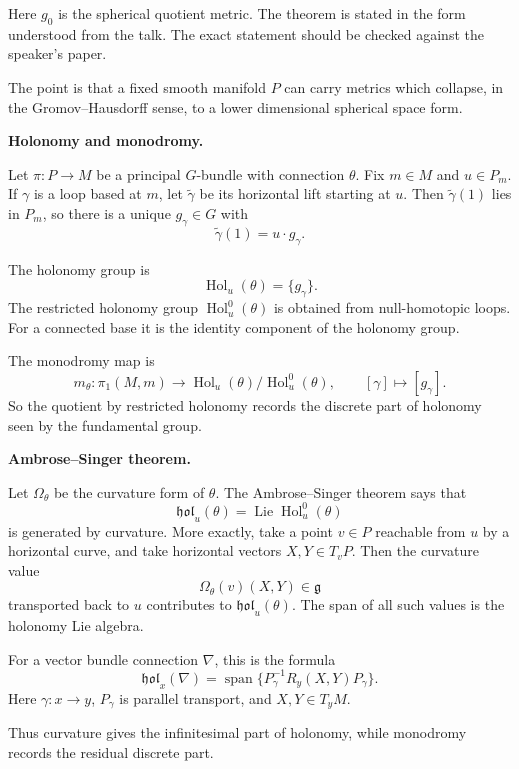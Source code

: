 Here $g_0$ is the spherical quotient
metric.
The theorem is stated in the form
understood from the talk.
The exact statement should be checked
against the speaker's paper.

The point is that a fixed smooth
manifold $P$ can carry metrics which
collapse, in the Gromov--Hausdorff
sense, to a lower dimensional spherical
space form.

\medskip\noindent
{\bf Holonomy and monodromy.}

Let $\pi:P\to M$ be a principal
$G$-bundle with connection $\theta$.
Fix $m\in M$ and $u\in P_m$.
If $\gamma$ is a loop based at $m$,
let $\widetilde\gamma$ be its
horizontal lift starting at $u$.
Then $\widetilde\gamma(1)$ lies in
$P_m$, so there is a unique
$g_\gamma\in G$ with
$$
        \widetilde\gamma(1)
        =
        u\cdot g_\gamma .
$$

The holonomy group is
$$
        \operatorname{Hol}_u(\theta)
        =
        \{g_\gamma\}.
$$
The restricted holonomy group
$\operatorname{Hol}_u^0(\theta)$ is
obtained from null-homotopic loops.
For a connected base it is the
identity component of the holonomy
group.

The monodromy map is
$$
        m_\theta:\pi_1(M,m)\to
        \operatorname{Hol}_u(\theta)/
        \operatorname{Hol}_u^0(\theta),
        \qquad
        [\gamma]\mapsto [g_\gamma].
$$
So the quotient by restricted holonomy
records the discrete part of holonomy
seen by the fundamental group.

\medskip\noindent
{\bf Ambrose--Singer theorem.}

Let $\Omega_\theta$ be the curvature
form of $\theta$.
The Ambrose--Singer theorem says that
$$
        \mathfrak{hol}_u(\theta)
        =
        \operatorname{Lie}
        \operatorname{Hol}_u^0(\theta)
$$
is generated by curvature.
More exactly, take a point $v\in P$
reachable from $u$ by a horizontal
curve, and take horizontal vectors
$X,Y\in T_vP$.
Then the curvature value
$$
        \Omega_\theta(v)(X,Y)
        \in\mathfrak g
$$
transported back to $u$ contributes to
$\mathfrak{hol}_u(\theta)$.
The span of all such values is the
holonomy Lie algebra.

For a vector bundle connection $\nabla$,
this is the formula
$$
        \mathfrak{hol}_x(\nabla)
        =
        \operatorname{span}\{
        P_\gamma^{-1}R_y(X,Y)P_\gamma
        \}.
$$
Here $\gamma:x\to y$, $P_\gamma$ is
parallel transport, and
$X,Y\in T_yM$.

Thus curvature gives the infinitesimal
part of holonomy, while monodromy
records the residual discrete part.

